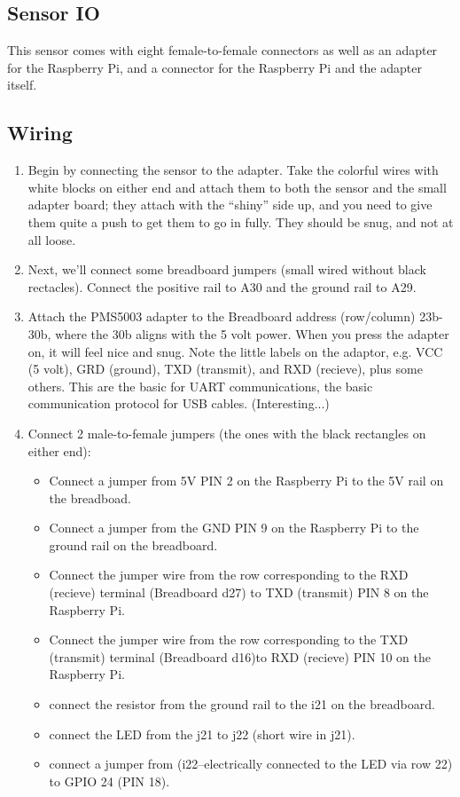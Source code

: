 \documentclass{article}
\begin{document}
\subsection{Sensor IO}

This sensor comes with eight female-to-female connectors as well as an adapter for the Raspberry Pi, and a connector for the Raspberry Pi and the adapter itself.  

\subsection{Wiring}

\begin{enumerate}
  \item Begin by connecting the sensor to the adapter. Take the colorful wires with white blocks on either end and attach them to both the sensor and the small adapter board; they attach with the ``shiny'' side up, and you need to give them quite a push to get them to go in fully. They should be snug, and not at all loose.

  \item Next, we'll connect some breadboard jumpers (small wired without black rectacles). Connect the positive rail to A30 and the ground rail to A29. 
  
  \item Attach the PMS5003 adapter to the Breadboard address (row/column) 23b-30b, where the 30b aligns with the 5 volt power. When you press the adapter on, it will feel nice and snug. Note the little labels on the adaptor, e.g. VCC (5 volt), GRD (ground), TXD (transmit), and RXD (recieve), plus some others. This are the basic for UART communications, the basic communication protocol for USB cables. (Interesting...)
  
  \item Connect 2 male-to-female jumpers (the ones with the black rectangles on either end):
 

\begin{itemize}
  \item Connect a jumper from 5V PIN 2 on the Raspberry Pi to the 5V rail on the breadboad.

  \item Connect a jumper from the GND PIN 9 on the Raspberry Pi to the ground rail on the breadboard. 

  \item Connect the jumper wire from the row corresponding to the RXD (recieve) terminal (Breadboard d27) to TXD (transmit) PIN 8 on the Raspberry Pi. 
  \item Connect the jumper wire from the row corresponding to the TXD (transmit) terminal (Breadboard d16)to RXD (recieve) PIN 10 on the Raspberry Pi.
  \item connect the resistor from the ground rail to the i21 on the breadboard. 
  \item connect the LED from the j21 to j22 (short wire in j21).
  \item connect a jumper from (i22--electrically connected to the LED via row 22) to GPIO 24 (PIN 18).
\end{itemize}


\end{enumerate}
\end{document}

